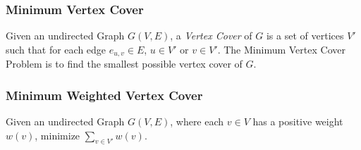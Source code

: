 \subsubsection{Minimum Vertex Cover}
\label{sub:mvc}
Given an undirected Graph $G(V,E)$, a {\em Vertex Cover} of $G$ is a set of vertices $V'$ such that for each edge $e_{u,v} \in E$, $u \in V'$ or $v \in V'$. The Minimum Vertex Cover Problem is to find the smallest possible vertex cover of $G$.

\subsubsection{Minimum Weighted Vertex Cover}
\label{sub:mwvc}
Given an undirected Graph $G(V,E)$, where each $v \in V$ has a positive weight $w(v)$, minimize $\sum_{v \in V'} w(v)$.


